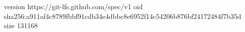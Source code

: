 version https://git-lfs.github.com/spec/v1
oid sha256:a911af4c8789fbbf91cdb34e4dbbc8e6952f14c54206b876bf24172484f7b35d
size 131168
